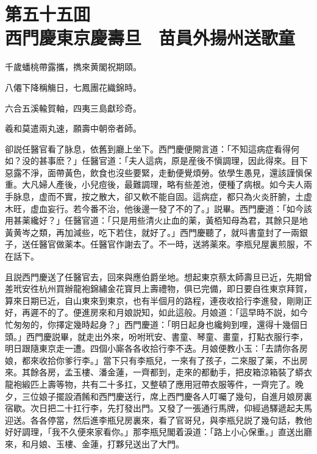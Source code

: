 
\chapter*{第五十五囬　\\西門慶東京慶壽旦　苗員外揚州送歌童}


\begin{myquote}
千歲蟠桃帶露攜，擕來黄閣祝期頤。

八僊下降稱觴日，七鳳團花織錦時。

六合五溪輸賀軸，四夷三島獻珍奇。

羲和莫遣兩丸速，願壽中朝帝者師。
\end{myquote}

卻説任醫官看了脉息，依舊到廳上坐下。西門慶便開言道：「不知這病症看得何如？没的甚事麽？」任醫官道：「夫人這病，原是産後不愼調理，因此得來。目下惡露不淨，面帶黃色，飲食也沒些要緊，走動便覺煩勞。依學生愚見，還該謹愼保重。大凡婦人產後，小兒痘後，最難調理，略有些差池，便種了病根。如今夫人兩手脉息，虚而不實，按之散大，卻又軟不能自固。這病症，都只為火炎肝腑，土虚木旺，虚血妄行。若今番不治，他後邊一發了不的了。」説畢。西門慶道：「如今該用甚薬纔好？」任醫官道：「只是用些清火止血的薬，黃栢知母為君，其餘只是地黃黄岑之類，再加減些，吃下若住，就好了。」西門慶聽了，就呌書童封了一兩銀子，送任醫官做薬本。任醫官作謝去了。不一時，送將薬來。李瓶兒屋裏煎服，不在話下。

且説西門慶送了任醫官去，回來與應伯爵坐地。想起東京蔡太師壽旦已近，先期曾差玳安徃杭州買辦龍袍錦繡金花寳貝上壽禮物，俱已完備，即日要自徃東京拜賀，算來日期已近，自山東來到東京，也有半個月的路程，連夜收拾行李進發，剛剛正好，再遲不的了。便進房來和月娘説知，如此這般。月娘道：「這早時不説，如今忙匆匆的，你擇定幾時起身？」西門慶道：「明日起身也纔夠到哩，還得十幾個日頭。」西門慶説畢，就走出外來，吩咐玳安、書童、琴童、畫童，打點衣服行李，明日跟隨東京走一遭。四個小廝各各收拾行李不迭。月娘便教小玉：「去請你各房娘，都來收拾你爹行李。」當下只有李瓶兒，一來有了孩子，二來服了薬，不出房來。其餘各房，孟玉樓、潘金蓮，一齊都到，走來的都動手，把皮箱涼箱裝了蟒衣龍袍緞匹上壽等物，共有二十多扛，又整頓了應用冠帶衣服等件，一齊完了。晚夕，三位娘子擺設酒餚和西門慶送行，席上西門慶各人叮囑了幾句，自進月娘房裏宿歇。次日把二十扛行李，先打發出門。又發了一張通行馬牌，仰經過驛遞起夫馬迎送。各各停當，然后進李瓶兒房裏來，看了官哥兒，與李瓶兒説了幾句話，教他好好調理，「我不久便來家看你。」那李瓶兒閣着淚道：「路上小心保重。」直送出廳來，和月娘、玉樓、金蓮，打夥兒送出了大門。

